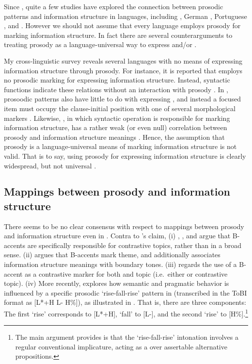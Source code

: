 Since \citet{jackendoff:72}, quite a few studies have explored the
connection between prosodic patterns and information structure in
languages, including  \citep{steedman:00}, German
\citep{buring:03}, Portuguese \citep{frota:00},  and
 \citep{ueyama:jun:98}.  However we should not assume that
every language employs prosody for marking information structure.  In
fact there are several counterarguments to treating prosody as a
language-universal way to express  and/or .



My cross-linguistic survey reveals several languages with no means of
expressing information structure through prosody.  For instance, it is
reported that  employs no prosodic marking for
expressing information structure.  Instead, syntactic functions
indicate these relations without an interaction with prosody
\citep{kugler:etal:07}.  In , prosoodic patterns also have
little to do with expressing , and instead a focused item must
occupy the clause-initial position with one of several morphological
markers \citep{drubig:03}. Likewise, ,
in which syntactic operation is responsible for marking information
structure, has a rather weak (or even null) correlation between
prosody and information structure meanings
\citep{engdahl:vallduvi:96}. Hence, the assumption that
prosody is a language-universal means of marking information structure
is not valid.  That is to say, using prosody for expressing
information structure is clearly widespread, but not universal
\citep{drellishak:09}.


\subsection{Mappings between prosody and information structure}
\label{4:ssec:conditions}


There seems to be no clear consensus with respect to mappings between
prosody and information structure even in . Contra to
\citeauthor{jackendoff:72}'s claim, (i) \citet{kadmon:01},
\citet{buring:03}, and \citet{oshima:08} argue that B-accents are
specifically responsible for contrastive topics,
rather than  in a broad sense.
(ii) \citet{steedman:00} argues that B-accents mark
theme, and additionally associates information structure meanings with
boundary tones.  (iii) \citet{hedberg:06} regards the use of a
B-accent as a contrastive marker for both  and topic
(i.e.\ either  or contrastive topic). (iv) More
recently, \citet{constant:12} explores how semantic and pragmatic
behavior is influenced by a specific prosodic `rise-fall-rise' pattern
in  (transcribed in the ToBI format as [L*+H L- H\%]), as
illustrated in . That is, there are three
components: The first `rise' corresponds to [L*+H], `fall' to [L-],
and the second `rise' to [H\%].\footnote{The main argument
  \citet{constant:12} provides is that the `rise-fall-rise' intonation
  involves a regular conventional implicature, acting as a   over assertable alternative
  propositions.}

